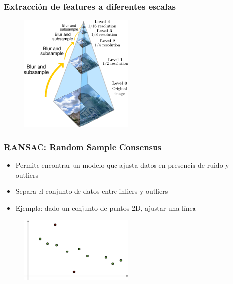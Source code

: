 \begin{frame}
    \frametitle{Extracción de features a diferentes escalas}
    
    \begin{figure}
        \includegraphics[width=0.5\textwidth]{./images/image_pyramid.pdf}
    \end{figure}

\end{frame}

\begin{frame}
    \frametitle{RANSAC: Random Sample Consensus}
    \footnotesize
    
    \begin{itemize}
        \item Permite encontrar un modelo que ajusta datos en presencia de ruido y outliers
        \item Separa el conjunto de datos entre inliers y outliers
        \item Ejemplo: dado un conjunto de puntos 2D, ajustar una línea 
    \end{itemize}
    
    \begin{figure}
        \includegraphics[width=0.5\textwidth]{./images/ransac1.pdf}
    \end{figure}
    
\end{frame}


